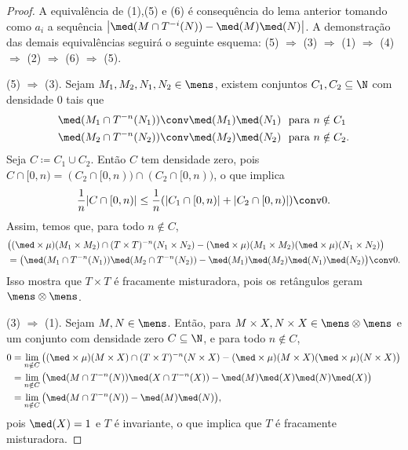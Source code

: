 \begin{proof}
	A equivalência de (1),(5) e (6) é consequência do lema anterior tomando como $a_i$ a sequência $\left|\med(M \cap T^{-i}(N)) - \med(M)\med(N)\right|$.
	A demonstração das demais equivalências seguirá o seguinte esquema: (5) $\Rightarrow$ (3) $\Rightarrow$ (1) $\Rightarrow$ (4) $\Rightarrow$ (2) $\Rightarrow$ (6) $\Rightarrow$ (5).

	 (5) $\Rightarrow$ (3). Sejam $M_1,M_2,N_1,N_2 \in \mens$, existem conjuntos $C_1,C_2 \subseteq \N$ com densidade $0$ tais que
	 \begin{align*}
	 \med(M_1 \cap T^{-n}(N_1)) &\conv \med(M_1)\med(N_1) \text{\ \ para $n \notin C_1$} \\
	 \med(M_2 \cap T^{-n}(N_2)) &\conv \med(M_2)\med(N_2) \text{\ \ para $n \notin C_2$}. \\
	 \end{align*}
	Seja $C \coloneqq C_1 \cup C_2$. Então $C$ tem densidade zero, pois $C \cap [0,n) = (C_2 \cap [0,n)) \cap (C_2 \cap [0,n))$, o que implica
	\begin{equation*}
	\frac{1}{n} |C \cap [0,n)| \leq \frac{1}{n}(|C_1 \cap [0,n)|+|C_2 \cap [0,n)|) \conv 0.
	\end{equation*}
Assim, temos que, para todo $n \notin C$,
	\begin{align*}
	&\big((\med\times\mu)(M_1 \times M_2) \cap (T \times T)^{-n}(N_1 \times N_2) - (\med\times\mu)(M_1 \times M_2)(\med\times\mu)(N_1\times N_2) \big) \\
	&=\big(\med(M_1 \cap T^{-n}(N_1))\med(M_2 \cap T^{-n}(N_2))-\med(M_1)\med(M_2)\med(N_1)\med(N_2) \big) \conv 0.
	\end{align*}
Isso mostra que $T \times T$ é fracamente misturadora, pois os retângulos geram $\mens \otimes \mens$.

(3) $\Rightarrow$ (1). Sejam $M,N \in \mens$. Então, para $M \times X,N\times X \in \mens \otimes \mens$ e um conjunto com densidade zero $C \subseteq \N$, e para todo $n \notin C$,
	\begin{align*}
	0&=\lim_{n \notin C} \big((\med\times\mu)(M \times X) \cap (T \times T)^{-n}(N \times X) - (\med\times\mu)(M \times X)(\med\times\mu)(N\times X) \big) \\
	&=\lim_{n \notin C} \big(\med(M \cap T^{-n}(N))\med(X \cap T^{-n}(X))-\med(M)\med(X)\med(N)\med(X) \big) \\
	&= \lim_{n \notin C} \big(\med(M \cap T^{-n}(N)) - \med(M)\med(N) \big),
	\end{align*}
pois $\med(X)=1$ e $T$ é invariante, o que implica que $T$ é fracamente misturadora.


\end{proof}

